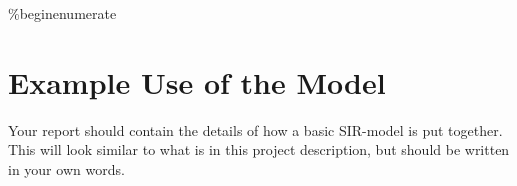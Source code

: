 \documentclass
[justified,nohyper]
{tufte-handout}
\begin{document}
\%begin{enumerate}

\section{Example Use of the Model}
Your report should contain the details of how a basic SIR-model is put together.
This will look similar to what is in this project description, but should be
written in your own words.
\end{document}
